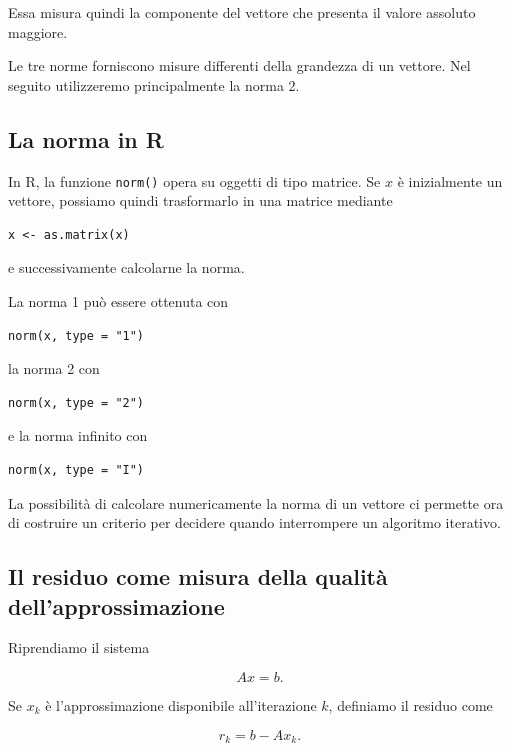 Essa misura quindi la componente del vettore che presenta il
valore assoluto maggiore.

Le tre norme forniscono misure differenti della grandezza di un
vettore. Nel seguito utilizzeremo principalmente la norma 2.


\subsection{La norma in \textsf{R}}

In \textsf{R}, la funzione \texttt{norm()} opera su oggetti di
tipo matrice. Se $x$ è inizialmente un vettore, possiamo quindi
trasformarlo in una matrice mediante

\begin{verbatim}
x <- as.matrix(x)
\end{verbatim}

e successivamente calcolarne la norma.

La norma 1 può essere ottenuta con

\begin{verbatim}
norm(x, type = "1")
\end{verbatim}

la norma 2 con

\begin{verbatim}
norm(x, type = "2")
\end{verbatim}

e la norma infinito con

\begin{verbatim}
norm(x, type = "I")
\end{verbatim}

La possibilità di calcolare numericamente la norma di un vettore
ci permette ora di costruire un criterio per decidere quando
interrompere un algoritmo iterativo.


\subsection{Il residuo come misura della qualità dell'approssimazione}

Riprendiamo il sistema

\begin{equation*}
    Ax=b.
\end{equation*}

Se $x_k$ è l'approssimazione disponibile all'iterazione $k$,
definiamo il residuo come

\begin{equation*}
    r_k=b-Ax_k.
    \label{eq:residuo-implementazione}
\end{equation*}


